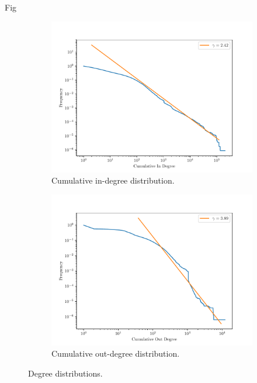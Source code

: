 \documentclass[9pt,a4paper,twocolumn]{article}
\begin{document}
Fig
\begin{figure}[h]
	\centering
	\begin{subfigure}{.45\textwidth}
		\centering
		\includegraphics[width=\linewidth]{wikipedia_pt_in.pdf}
		\caption{Cumulative in-degree distribution.}
		\label{fig:inddist}
	\end{subfigure}
	\begin{subfigure}{.45\textwidth}
		\centering
		\includegraphics[width=\linewidth]{wikipedia_pt_out.pdf}
		\caption{Cumulative out-degree distribution.}
		\label{fig:outddist}
	\end{subfigure}
	\caption{Degree distributions.}
\end{figure}
\end{document}
